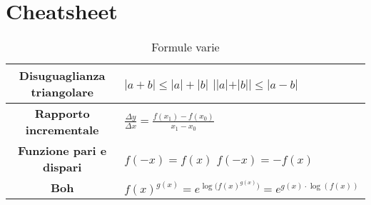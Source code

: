 \newpage
\section{Cheatsheet}

\begin{table}[h!]
	\setlength{\tabcolsep}{7pt}
	\renewcommand{\arraystretch}{2}
	\centering
	\begin{tabular}{|c|P{180px}|}
		\hline
		\textbf{Disuguaglianza triangolare} &  \\
		\hline
		\textbf{Rapporto incrementale} & $\frac{\Delta y}{\Delta x} = \frac{f(x_1)-f(x_0)}{x_1-x_0}$ \\
		\hline
		\textbf{Funzione pari e dispari} &  \\
		\hline
		\textbf{Boh} & $f(x)^{g(x)} = e^{{\log{(f(x)}^ {g(x)})}} = e^{ g(x) \cdot \log{(f(x))}}$ \\
		\hline
	\end{tabular}
	\caption{Formule varie}
\end{table}


